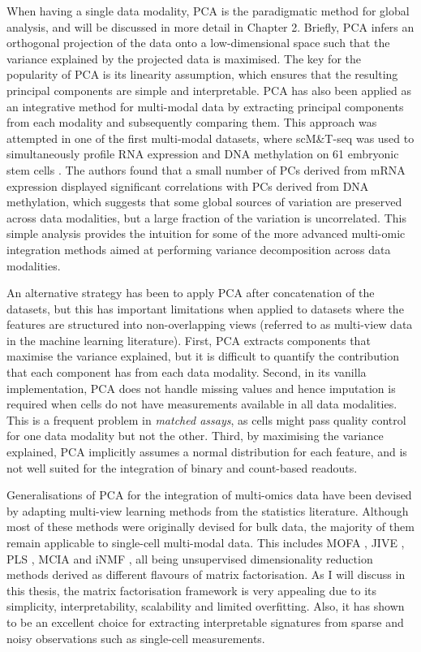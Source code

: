 When having a single data modality, PCA is the paradigmatic method for global analysis, and will be discussed in more detail in Chapter 2. Briefly, PCA infers an orthogonal projection of the data onto a low-dimensional space such that the variance explained by the projected data is maximised. The key for the popularity of PCA is its linearity assumption, which ensures that the resulting principal components are simple and interpretable. PCA has also been applied as an integrative method for multi-modal data by extracting principal components from each modality and subsequently comparing them. This approach was attempted in one of the first multi-modal datasets, where scM\&T-seq was used to simultaneously profile RNA expression and DNA methylation on 61 embryonic stem cells \cite{Angermueller2016}. The authors found that a small number of PCs derived from mRNA expression displayed significant correlations with PCs derived from DNA methylation, which suggests that some global sources of variation are preserved across data modalities, but a large fraction of the variation is uncorrelated. This simple analysis provides the intuition for some of the more advanced multi-omic integration methods aimed at performing variance decomposition across data modalities.

An alternative strategy has been to apply PCA after concatenation of the datasets, but this has important limitations when applied to datasets where the features are structured into non-overlapping views (referred to as multi-view data in the machine learning literature). First, PCA extracts components that maximise the variance explained, but it is difficult to quantify the contribution that each component has from each data modality. Second, in its vanilla implementation, PCA does not handle missing values and hence imputation is required when cells do not have measurements available in all data modalities. This is a frequent problem in \textit{matched assays}, as cells might pass quality control for one data modality but not the other. Third, by maximising the variance explained, PCA implicitly assumes a normal distribution for each feature, and is not well suited for the integration of binary and count-based readouts. 

Generalisations of PCA for the integration of multi-omics data have been devised by adapting multi-view learning methods from the statistics literature. Although most of these methods were originally devised for bulk data, the majority of them remain applicable to single-cell multi-modal data. This includes MOFA \cite{Argelaguet2018}, JIVE \cite{Lock2013}, PLS \cite{Singh2018}, MCIA \cite{Meng2014} and iNMF \cite{Welch2019}, all being unsupervised dimensionality reduction methods derived as different flavours of matrix factorisation. As I will discuss in this thesis, the matrix factorisation framework is very appealing due to its simplicity, interpretability, scalability and limited overfitting. Also, it has shown to be an excellent choice for extracting interpretable signatures from sparse and noisy observations such as single-cell measurements.


